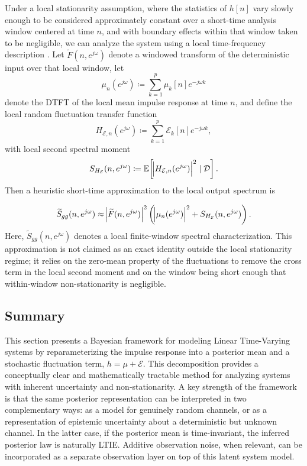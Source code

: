 \documentclass[preprint,1p,times,authoryear]{elsarticle}
\begin{document}
Under a local stationarity assumption, where the statistics of $h[n]$ vary slowly enough to be considered approximately constant over a short-time analysis window centered at time $n$, and with boundary effects within that window taken to be negligible, we can analyze the system using a local time-frequency description \citep{Priestley1965, Dahlhaus1997}. Let $\widetilde{F}(n,e^{j\omega})$ denote a windowed transform of the deterministic input over that local window, let
 \[
 \mu_n(e^{j\omega}) \coloneqq \sum_{k=1}^{p} \mu_k[n] e^{-j\omega k}
 \]
denote the DTFT of the local mean impulse response at time $n$, and define the local random fluctuation transfer function
\[
H_{\mathcal{E},n}(e^{j\omega}) \coloneqq \sum_{k=1}^{p} \mathcal{E}_k[n] e^{-j\omega k},
\]
with local second spectral moment
\[
S_{H_{\mathcal{E}}}(n,e^{j\omega}) \coloneqq \mathbb{E}\!\left[\abs{H_{\mathcal{E},n}(e^{j\omega})}^2 \mid \mathcal{D}\right].
\]
Then a heuristic short-time approximation to the local output spectrum is


\begin{equation}
\widetilde{S}_{gg}(n, e^{j\omega}) \approx \abs{\widetilde{F}(n,e^{j\omega})}^2 \left( \abs{\mu_n(e^{j\omega})}^2 + S_{H_{\mathcal{E}}}(n, e^{j\omega}) \right).
\end{equation}
Here, $\widetilde{S}_{gg}(n, e^{j\omega})$ denotes a local finite-window spectral characterization. This approximation is not claimed as an exact identity outside the local stationarity regime; it relies on the zero-mean property of the fluctuations to remove the cross term in the local second moment and on the window being short enough that within-window non-stationarity is negligible.

\subsection{Summary}

This section presents a Bayesian framework for modeling Linear Time-Varying systems by reparameterizing the impulse response into a posterior mean and a stochastic fluctuation term, $h = \mu + \mathcal{E}$. This decomposition provides a conceptually clear and mathematically tractable method for analyzing systems with inherent uncertainty and non-stationarity. A key strength of the framework is that the same posterior representation can be interpreted in two complementary ways: as a model for genuinely random channels, or as a representation of epistemic uncertainty about a deterministic but unknown channel. In the latter case, if the posterior mean is time-invariant, the inferred posterior law is naturally LTIE. Additive observation noise, when relevant, can be incorporated as a separate observation layer on top of this latent system model.
\end{document}
